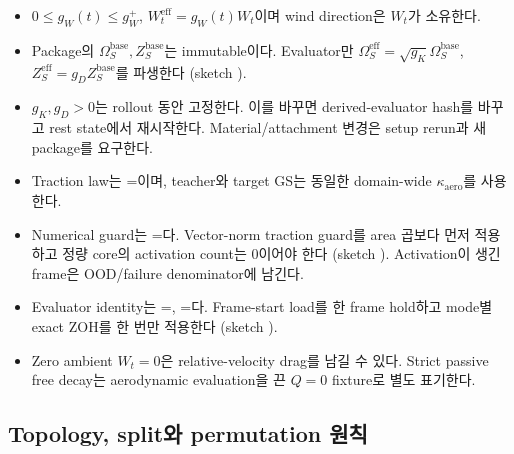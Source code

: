 \documentclass[10pt]{article}
\begin{document}
\begin{itemize}
  \item \(0\le g_W(t)\le g_W^+\), \(W_t^{\mathrm{eff}}=g_W(t)W_t\)이며 wind direction은 \(W_t\)가 소유한다.
  \item Package의 \(\Omega_S^{\mathrm{base}},Z_S^{\mathrm{base}}\)는 immutable이다. Evaluator만
  \(\Omega_S^{\mathrm{eff}}=\sqrt{g_K}\Omega_S^{\mathrm{base}}\),
  \(Z_S^{\mathrm{eff}}=g_DZ_S^{\mathrm{base}}\)를 파생한다
  (sketch ).
  \item \(g_K,g_D>0\)는 rollout 동안 고정한다. 이를 바꾸면 derived-evaluator hash를 바꾸고 rest state에서
  재시작한다. Material/attachment 변경은 setup rerun과 새 package를 요구한다.
  \item Traction law는 =이며,
  teacher와 target GS는 동일한 domain-wide \(\kappa_{\mathrm{aero}}\)를 사용한다.
  \item Numerical guard는 =다.
  Vector-norm traction guard를 area 곱보다 먼저 적용하고 정량 core의 activation count는 0이어야 한다
  (sketch ). Activation이 생긴 frame은 OOD/failure denominator에 남긴다.
  \item Evaluator identity는 =,
  =다.
  Frame-start load를 한 frame hold하고 mode별 exact ZOH를 한 번만 적용한다
  (sketch ).
  \item Zero ambient \(W_t=0\)은 relative-velocity drag를 남길 수 있다. Strict passive free decay는
  aerodynamic evaluation을 끈 \(Q=0\) fixture로 별도 표기한다.
\end{itemize}

\subsection{Topology, split와 permutation 원칙}
\end{document}
